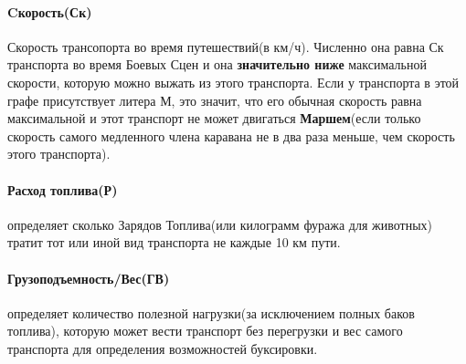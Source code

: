 \paragraph{Cкорость(Ск)} Скорость трансопорта во время путешествий(в км/ч). Численно она равна Ск транспорта во время Боевых Сцен и она \textbf{значительно ниже} максимальной скорости, которую можно выжать из этого транспорта. Если у транспорта в этой графе присутствует литера М, это значит, что его обычная скорость равна максимальной и этот транспорт не может двигаться \textbf{Маршем}(если только скорость самого медленного члена каравана не в два раза меньше, чем скорость этого транспорта).
\paragraph{Расход топлива(Р)} определяет сколько Зарядов Топлива(или килограмм фуража для животных) тратит тот или иной вид транспорта не каждые 10 км пути.
\paragraph{Грузоподъемность/Вес(ГВ)} определяет количество полезной нагрузки(за исключением полных баков топлива), которую может вести транспорт без перегрузки и вес самого транспорта для определения возможностей буксировки.

